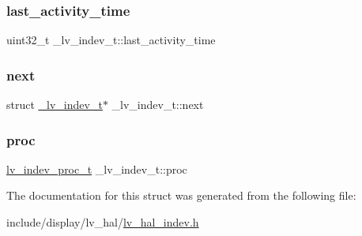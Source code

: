 \mbox{\label{struct__lv__indev__t_a1ae81aed5ba30e123067b99467d9d9aa}} 
\subsubsection{\texorpdfstring{last\_activity\_time}{last\_activity\_time}}
{\footnotesize\ttfamily uint32\+\_\+t \+\_\+lv\+\_\+indev\+\_\+t\+::last\+\_\+activity\+\_\+time}

\mbox{\label{struct__lv__indev__t_a79b395b9d7d45b376a14b2e0be430ff0}} 
\subsubsection{\texorpdfstring{next}{next}}
{\footnotesize\ttfamily struct \mbox{\hyperlink{struct__lv__indev__t}{\+\_\+lv\+\_\+indev\+\_\+t}}$\ast$ \+\_\+lv\+\_\+indev\+\_\+t\+::next}

\mbox{\label{struct__lv__indev__t_a3223b37d15de61de4d0be84d22b7900e}} 
\subsubsection{\texorpdfstring{proc}{proc}}
{\footnotesize\ttfamily \mbox{\hyperlink{lv__hal__indev_8h_a879d56a3b2755d01640a0404c9382a2d}{lv\+\_\+indev\+\_\+proc\+\_\+t}} \+\_\+lv\+\_\+indev\+\_\+t\+::proc}



The documentation for this struct was generated from the following file\+:\begin{DoxyCompactItemize}
\item 
include/display/lv\+\_\+hal/\mbox{\hyperlink{lv__hal__indev_8h}{lv\+\_\+hal\+\_\+indev.\+h}}\end{DoxyCompactItemize}
